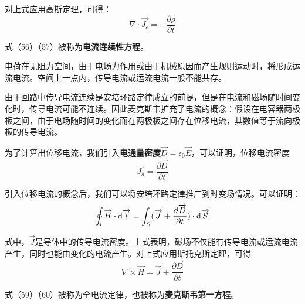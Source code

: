 \documentclass[UTF8,a4paper,11pt]{article}
\begin{document}
对上式应用高斯定理，可得：
\begin{equation}
\nabla\cdot\overrightarrow{J_c}=-\frac{\partial\rho}{\partial t}
\end{equation}

式（56）（57）被称为\textbf{电流连续性方程}。

电荷在无阻力空间，由于电场力作用或由于机械原因而产生规则运动时，将形成运流电流。空间上一点内，传导电流或运流电流一般不能共存。

由于回路中传导电流连续是安培环路定律成立的前提，但是在电流和磁场随时间变化时，传导电流可能不连续。因此麦克斯韦扩充了电流的概念：假设在电容器两极板之间，由于电场随时间的变化而在两极板之间存在位移电流，其数值等于流向极板的传导电流。

为了计算出位移电流，我们引入\textbf{电通量密度}$\overrightarrow{D}=\epsilon_0\overrightarrow{E}$，可以证明，位移电流密度
\begin{equation}
\overrightarrow{J_d}=\frac{\partial \overrightarrow{D}}{\partial t}
\end{equation}

引入位移电流的概念后，我们可以将安培环路定律推广到时变场情况。可以证明：
\begin{equation}
\oint_l\overrightarrow{H}\cdot{\rm d}\overrightarrow{l}=\int_S(\overrightarrow{J}+\frac{\partial \overrightarrow{D}}{\partial t})\cdot{\rm d}\overrightarrow{S}
\end{equation}

式中，$\overrightarrow{J}$是导体中的传导电流密度。上式表明，磁场不仅能有传导电流或运流电流产生，同时也能由变化的电流产生。对上式应用斯托克斯定理，可得
\begin{equation}
\nabla\times\overrightarrow{H}=\overrightarrow{J}+\frac{\partial \overrightarrow{D}}{\partial t}
\end{equation}

式（59）（60）被称为全电流定律，也被称为\textbf{麦克斯韦第一方程}。
\end{document}
